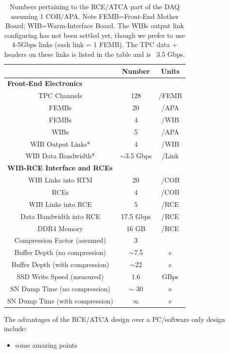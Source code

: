 \begin{table}[htp]
\begin{center}
\begin{tabular}{|c|c|c|}
\hline
     & Number           &     Units \\
     \hline
\multicolumn{3}{|l|}{\bf{Front-End Electronics}} \\
\hline
TPC Channels & 128 & /FEMB \\
FEMBs  & 20  & /APA \\
FEMBs  & 4  & /WIB  \\
WIBs  & 5  & /APA\\
WIB Output Links* & 4 & /WIB\\
WIB Data Bandwidth* & $\sim$3.5 Gbps & /Link\\
\hline
\multicolumn{3}{|l|}{\bf{WIB-RCE Interface and RCEs}} \\
\hline
WIB Links into RTM & 20 & /COB\\
RCEs    & 4  &  /COB\\
WIB Links into RCE & 5 & /RCE\\
Data Bandwidth into RCE & 17.5 Gbps & /RCE\\
DDR4 Memory    & 16 GB & /RCE\\
Compression Factor (assumed)  & 3  &  \\
Buffer Depth (no compression)   &  $\sim$7.5  &  s  \\
Buffer Depth (with compression)   &  $\sim$22  &  s  \\
SSD Write Speed (measured)  & 1.6 & GBps \\ 
SN Dump Time (no compression)  &  $\sim$ 30  & s\\
SN Dump Time (with compression)  &  $\infty$  & s\\
\hline
\end{tabular}
\end{center}
\caption{ Numbers pertaining to the RCE/ATCA part of the DAQ assuming 1 COB/APA.  Note FEMB=Front-End Mother Board; WIB=Warm-Interface Board.  The WIBs output link configuring has not been settled yet, though we prefer to use 4-5Gbps links (each link = 1 FEMB).  The TPC data + headers on these links is listed in the table and is ~3.5 Gbps. }
\label{default}
\end{table}%



The advantages of the RCE/ATCA design over a PC/software only design include: 
\begin{itemize}
\item some amazing points
\end{itemize}




